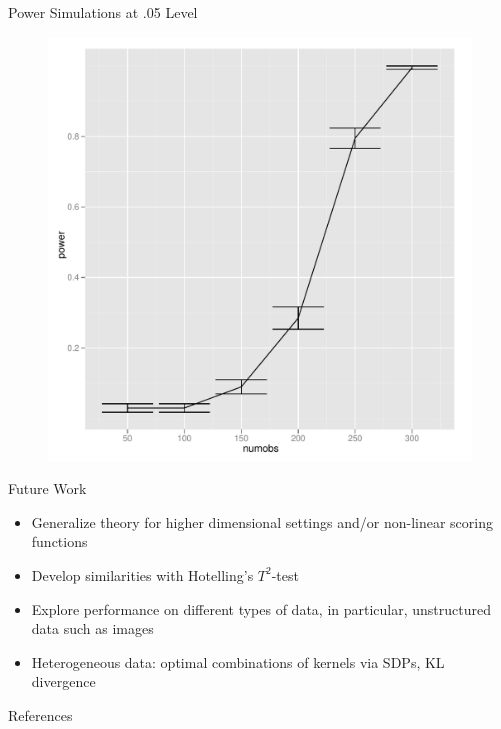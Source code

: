 \documentclass{beamer}
\begin{document}
\begin{frame}{Power Simulations at .05 Level}
   \begin{figure}[!ht]
   \centering
   \includegraphics[scale=.4]{pres7.pdf}
 \end{figure}
\end{frame}

\begin{frame}{Future Work}
  \begin{itemize}
  \item Generalize theory for higher dimensional settings and/or
    non-linear scoring functions \pause
  \item Develop similarities with Hotelling's $T^2$-test \pause
  \item Explore performance on different types of data, in particular,
    unstructured data such as images \pause
  \item Heterogeneous data: optimal combinations of kernels
    via SDPs, KL divergence \pause
  \end{itemize}
\end{frame}

\begin{frame}[allowframebreaks]{References}
  
  
\end{frame}
\end{document}
